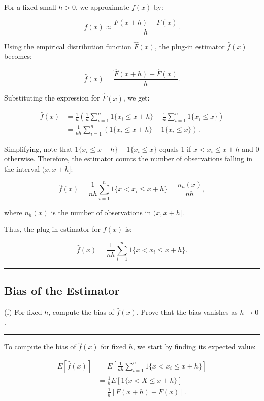 \documentclass{article}
\newenvironment{colorparagraph}[1]{\par\color{#1}}{\par}
\begin{document}
For a fixed small \( h > 0 \), we approximate \( f(x) \) by:

\[
f(x) \approx \frac{F(x + h) - F(x)}{h}.
\]

Using the empirical distribution function \( \hat{F}(x) \), the plug-in estimator \( \hat{f}(x) \) becomes:

\[
\hat{f}(x) = \frac{\hat{F}(x + h) - \hat{F}(x)}{h}.
\]

Substituting the expression for \( \hat{F}(x) \), we get:

\[
\begin{aligned}
\hat{f}(x) &= \frac{1}{h} \left( \frac{1}{n} \sum_{i=1}^n 1\{ x_i \leq x + h \} - \frac{1}{n} \sum_{i=1}^n 1\{ x_i \leq x \} \right) \\
&= \frac{1}{n h} \sum_{i=1}^n \left( 1\{ x_i \leq x + h \} - 1\{ x_i \leq x \} \right).
\end{aligned}
\]

Simplifying, note that \( 1\{ x_i \leq x + h \} - 1\{ x_i \leq x \} \) equals 1 if \( x < x_i \leq x + h \) and 0 otherwise. Therefore, the estimator counts the number of observations falling in the interval \( (x, x + h] \):

\[
\hat{f}(x) = \frac{1}{n h} \sum_{i=1}^n 1\{ x < x_i \leq x + h \} = \frac{n_h(x)}{n h},
\]

where \( n_h(x) \) is the number of observations in \( (x, x + h] \).

Thus, the plug-in estimator for \( f(x) \) is:

\[
\hat{f}(x) = \frac{1}{n h} \sum_{i=1}^n 1\{ x < x_i \leq x + h \}.
\]

\begin{colorparagraph}{questioncolor}
\label{q2f}
\rule{\textwidth}{0.5pt}
\subsection{Bias of the Estimator}
(f) For fixed \( h \), compute the bias of \( \hat{f}(x) \). Prove that the bias vanishes as \( h \to 0 \).

\rule{\textwidth}{0.5pt}
\end{colorparagraph}

To compute the bias of \( \hat{f}(x) \) for fixed \( h \), we start by finding its expected value:

\[
\begin{aligned}
E[\hat{f}(x)] &= E\left[ \frac{1}{n h} \sum_{i=1}^n 1\{ x < x_i \leq x + h \} \right] \\
&= \frac{1}{h} E\left[ 1\{ x < X \leq x + h \} \right] \\
&= \frac{1}{h} \left[ F(x + h) - F(x) \right].
\end{aligned}
\]
\end{document}
